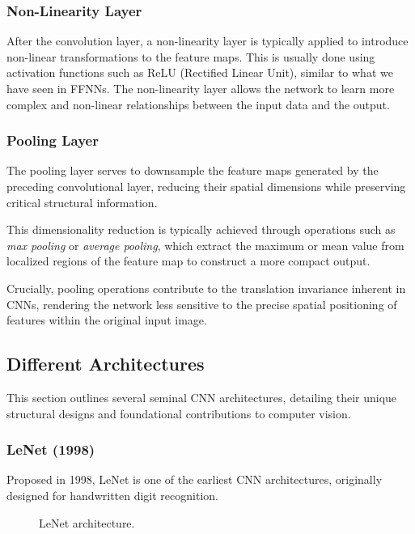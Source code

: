 \subsubsection{Non-Linearity Layer}
After the convolution layer, a non-linearity layer is typically applied to introduce non-linear transformations to the feature maps.
This is usually done using activation functions such as ReLU (Rectified Linear Unit), similar to what we have seen in FFNNs.
The non-linearity layer allows the network to learn more complex and non-linear relationships between the input data and the output.

\subsubsection{Pooling Layer} 
The pooling layer serves to downsample the feature maps generated by the preceding convolutional layer, reducing their spatial dimensions while preserving critical structural information. 

This dimensionality reduction is typically achieved through operations such as \textit{max pooling} or \textit{average pooling}, which extract the maximum or mean value from localized regions of the feature map to construct a more compact output. 

Crucially, pooling operations contribute to the translation invariance inherent in CNNs, rendering the network less sensitive to the precise spatial positioning of features within the original input image.

\subsection{Different Architectures}

This section outlines several seminal CNN architectures, detailing their unique structural designs and foundational contributions to computer vision.

\subsubsection{LeNet (1998)}
Proposed in 1998, LeNet is one of the earliest CNN architectures, originally designed for handwritten digit recognition.

\begin{figure}[H]
    \centering
    
    \caption{LeNet architecture.}
    \label{fig:LeNet}
\end{figure}

